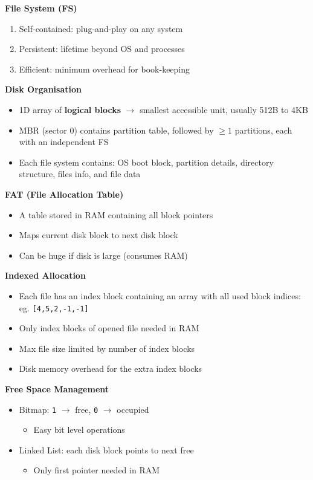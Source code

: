 \documentclass[a4paper, 12pt]{article}
\begin{document}
\begin{multicols*}{4}
{\small\textbf{File System (FS)}}
\begin{enumerate}
	\item Self-contained: plug-and-play on any system
	\item Persistent: lifetime beyond OS and processes
	\item Efficient: minimum overhead for book-keeping
\end{enumerate}
\textbf{Disk Organisation}
\begin{itemize}
	\item 1D array of \textbf{logical blocks} $\rightarrow$ smallest accessible unit, usually 512B to 4KB
	\item MBR (sector 0) contains partition table, followed by $\geq 1$ partitions, each with an independent FS
	\item Each file system contains: OS boot block, partition details, directory structure, files info, and file data
\end{itemize}
\textbf{FAT (File Allocation Table)}
\begin{itemize}
	\item A table stored in RAM containing all block pointers
	\item Maps current disk block to next disk block
	\item Can be huge if disk is large (consumes RAM)
\end{itemize}
\textbf{Indexed Allocation}
\begin{itemize}
	\item Each file has an index block containing an array with all used block indices: eg. \texttt{[4,5,2,-1,-1]}
	\item Only index blocks of opened file needed in RAM
	\item Max file size limited by number of index blocks
	\item Disk memory overhead for the extra index blocks
\end{itemize}
\textbf{Free Space Management}
\begin{itemize}
	\item Bitmap: \texttt{1} $\rightarrow$ free, \texttt{0} $\rightarrow$ occupied
	\begin{itemize}
		\item Easy bit level operations
	\end{itemize}
	\item Linked List: each disk block points to next free
	\begin{itemize}
		\item Only first pointer needed in RAM

\end{itemize}
\end{itemize}
\end{multicols*}
\end{document}
